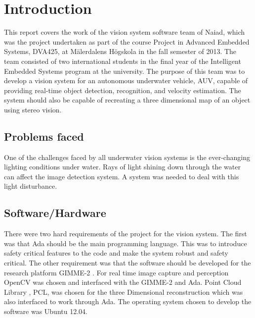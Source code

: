 \section{Introduction}\label{sec:introduction}
This report covers the work of the vision system software team of Naiad, which was the project undertaken as part of the course Project in Advanced Embedded Systems, DVA425, at M\"{a}lerdalens H\"{o}gskola in the fall semester of 2013. The team consisted of two international students in the final year of the Intelligent Embedded Systems program at the university.
The purpose of this team was to develop a vision system for an autonomous underwater vehicle, AUV, capable of providing real-time object detection, recognition, and velocity estimation. The system should also be capable of recreating a three dimensional map of an object using stereo vision.

\subsection{Problems faced}
One of the challenges faced by all underwater vision systems is the ever-changing lighting conditions under water. Rays of light shining down through the water can affect the image detection system. A system was needed to deal with this light disturbance.

\subsection{Software/Hardware}
There were two hard requirements of the project for the vision system. The first was that Ada should be the main programming language. This was to introduce safety critical features to the code and make the system robust and safety critical. The other requirement was that the software should be developed for the research platform GIMME-2 \cite{web:GIMME2}. 
For real time image capture and perception OpenCV \cite{web:OpenCV} was chosen and interfaced with the GIMME-2 and Ada. Point Cloud Library \cite{web:PCL}, PCL, was chosen for the three Dimensional reconstruction which was also interfaced to work through Ada. The operating system chosen to develop the software was Ubuntu 12.04.

